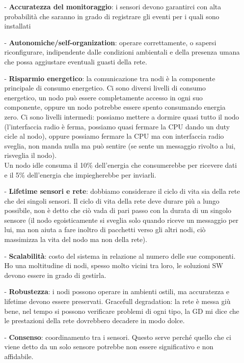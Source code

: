 \documentclass[12pt,italian]{report}
\begin{document}
\begin{itemize}
    \item[-] \textbf{Accuratezza del monitoraggio}: i sensori devono garantirci con alta probabilità che saranno in grado di registrare gli eventi per i quali sono installati
    \item[-] \textbf{Autonomiche/self-organization}: operare correttamente, o sapersi riconfigurare, indipendente dalle condizioni ambientali e della presenza umana che possa aggiustare eventuali guasti della rete. 
    \item[-] \textbf{Risparmio energetico}: la comunicazione tra nodi è la componente principale di consumo energetico. 
    \bigbreak
    Ci sono diversi livelli di consumo energetico, un nodo può essere completamente accesso in ogni suo componente, oppure un nodo potrebbe essere spento consumando energia zero. Ci sono livelli intermedi: possiamo mettere a dormire quasi tutto il nodo (l'interfaccia radio è ferma, possiamo quasi fermare la CPU dando un duty cicle al nodo), oppure possiamo fermare la CPU ma con interfaccia radio sveglia, non manda nulla ma può sentire (se sente un messaggio rivolto a lui, risveglia il nodo). \\ Un nodo idle consuma il 10\% dell'energia che consumerebbe per ricevere dati e il 5\% dell'energia che impiegherebbe per inviarli.  
    \item[-] \textbf{Lifetime sensori e rete}: dobbiamo considerare il ciclo di vita sia della rete che dei singoli sensori. Il ciclo di vita della rete deve durare più a lungo possibile, non è detto che ciò vada di pari passo con la durata di un singolo sensore (il nodo egoisticamente si sveglia solo quando riceve un messaggio per lui, ma non aiuta a fare inoltro di pacchetti verso gli altri nodi, ciò massimizza la vita del nodo ma non della rete). 
    \item[-] \textbf{Scalabilità}: costo del sistema in relazione al numero delle sue componenti. Ho una moltitudine di nodi, spesso molto vicini tra loro, le soluzioni SW devono essere in grado di gestirla. 
    \item[-] \textbf{Robustezza}: i nodi possono operare in ambienti ostili, ma accuratezza e lifetime devono essere preservati. Gracefull degradation: la rete è messa giù bene, nel tempo si possono verificare problemi di ogni tipo, la GD mi dice che le prestazioni della rete dovrebbero decadere in modo dolce. 
    \item[-] \textbf{Consenso}: coordinamento tra i sensori. Questo serve perché quello che ci viene detto da un solo sensore potrebbe non essere significativo e non affidabile. 
\end{itemize}
\end{document}
